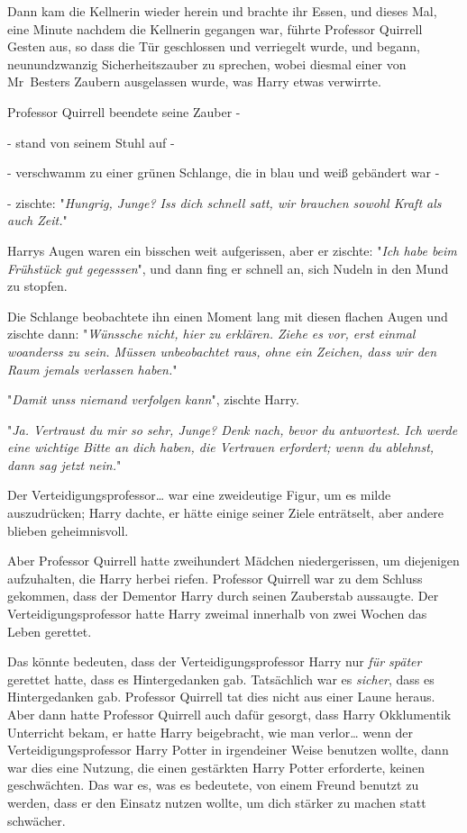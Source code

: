 {Dann kam die Kellnerin wieder herein und brachte ihr Essen, und dieses Mal, eine Minute nachdem die Kellnerin gegangen war, führte Professor Quirrell Gesten aus, so dass die Tür geschlossen und verriegelt wurde, und begann, neunundzwanzig Sicherheitszauber zu sprechen, wobei diesmal einer von Mr~Besters Zaubern ausgelassen wurde, was Harry etwas verwirrte.

Professor Quirrell beendete seine Zauber -

- stand von seinem Stuhl auf -

- verschwamm zu einer grünen Schlange, die in blau und weiß gebändert war -

- zischte: "\emph{Hungrig, Junge? Iss dich schnell satt, wir brauchen sowohl Kraft als auch Zeit.}"

Harrys Augen waren ein bisschen weit aufgerissen, aber er zischte: "\emph{Ich habe beim Frühstück gut gegesssen}", und dann fing er schnell an, sich Nudeln in den Mund zu stopfen.

Die Schlange beobachtete ihn einen Moment lang mit diesen flachen Augen und zischte dann: "\emph{Wünssche nicht, hier zu erklären. Ziehe es vor, erst einmal woanderss zu sein. Müssen unbeobachtet raus, ohne ein Zeichen, dass wir den Raum jemals verlassen haben.}"

"\emph{Damit unss niemand verfolgen kann}", zischte Harry.

"\emph{Ja. Vertraust du mir so sehr, Junge? Denk nach, bevor du antwortest. Ich werde eine wichtige Bitte an dich haben, die Vertrauen erfordert; wenn du ablehnst, dann sag jetzt nein.}"

Der Verteidigungsprofessor… war eine zweideutige Figur, um es milde auszudrücken; Harry dachte, er hätte einige seiner Ziele enträtselt, aber andere blieben geheimnisvoll.

Aber Professor Quirrell hatte zweihundert Mädchen niedergerissen, um diejenigen aufzuhalten, die Harry herbei riefen. Professor Quirrell war zu dem Schluss gekommen, dass der Dementor Harry durch seinen Zauberstab aussaugte. Der Verteidigungsprofessor hatte Harry zweimal innerhalb von zwei Wochen das Leben gerettet.

Das könnte bedeuten, dass der Verteidigungsprofessor Harry nur \emph{für später} gerettet hatte, dass es Hintergedanken gab. Tatsächlich war es \emph{sicher}, dass es Hintergedanken gab. Professor Quirrell tat dies nicht aus einer Laune heraus. Aber dann hatte Professor Quirrell auch dafür gesorgt, dass Harry Okklumentik Unterricht bekam, er hatte Harry beigebracht, wie man verlor… wenn der Verteidigungsprofessor Harry Potter in irgendeiner Weise benutzen wollte, dann war dies eine Nutzung, die einen gestärkten Harry Potter erforderte, keinen geschwächten. Das war es, was es bedeutete, von einem Freund benutzt zu werden, dass er den Einsatz nutzen wollte, um dich stärker zu machen statt schwächer.

}
